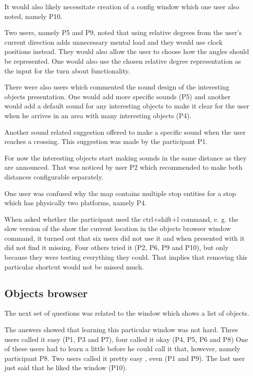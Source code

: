 \documentclass[nolof,digital]{fithesis3}
\begin{document}
It would also likely necessitate creation of a config window which one user also noted, namely P10.

Two users, namely  P5 and P9, noted that using relative degrees from the user's current direction adds unnecessary mental load and they would use clock positions instead. They would also allow the user to choose how the angles should be represented. One would also use the chosen relative degree representation as the input for the turn about functionality.

There were also users which commented the sound design of the interesting objects presentation. One would add more specific sounds (P5) and another would add a default sound for any interesting objects to make it clear for the user when he arrives in an area with many interesting objects (P4).

Another sound related suggestion offered to make a specific sound when the user reaches a crossing. This suggestion was made by the participant P1.

For now the interesting objects start making sounds in the same distance as they are announced. That was noticed by user P2 which recommended to make both distances configurable separately.

One  user was confused why the map contains multiple stop entities for a stop which has physically two platforms, namely P4.

When asked whether the participant used the ctrl+shift+l command, e. g. the slow version of the show the current location in the objects browser window command, it turned out that six users did not use it and when presented with it did not find it missing. Four others tried it (P2, P6, P9 and P10), but only because they were testing everything they could. That implies that removing this particular shortcut would not be missed much.
\subsection{Objects browser}
The next set of questions was related to the window which shows a list of objects.

The answers showed that learning this particular window was not hard. Three users called it easy (P1, P3 and P7), four called it okay (P4, P5, P6 and P8) One of these users had to learn a little before he could call it that, however, namely participant P8. Two users called it pretty easy , even (P1 and P9). The last user just said that he liked the window (P10).
\end{document}
